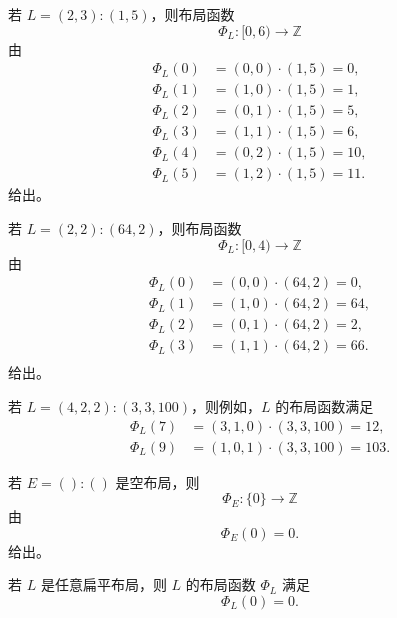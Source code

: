 \begin{example}\label{layoutfunctionexample1layout1}
    若 $L = (2,3):(1,5)$，则布局函数
    \[
    \Phi_L:[0,6) \to \mathbb{Z}
    \]
    由
    \begin{align*}
    \Phi_L(0) & = (0,0) \cdot (1,5) = 0,\\
    \Phi_L(1) & = (1,0) \cdot (1,5) = 1,\\
    \Phi_L(2) & = (0,1) \cdot (1,5) = 5,\\
    \Phi_L(3) & = (1,1) \cdot (1,5) = 6,\\
    \Phi_L(4) & = (0,2) \cdot (1,5) = 10,\\
    \Phi_L(5) & = (1,2) \cdot (1,5) = 11.
    \end{align*}
    给出。
\end{example}

\begin{example}\label{layoutfunctionexample1layout2}
    若 $L = (2,2):(64,2)$，则布局函数
    \[
    \Phi_L:[0,4) \to \mathbb{Z}
    \]
    由
    \begin{align*}
    \Phi_L(0) & = (0,0) \cdot (64,2) = 0,\\
    \Phi_L(1) & = (1,0) \cdot (64,2) = 64,\\
    \Phi_L(2) & = (0,1) \cdot (64,2) = 2,\\
    \Phi_L(3) & = (1,1) \cdot (64,2) = 66.\\
    \end{align*}
    给出。
\end{example}

\begin{example}\label{layoutfunctionexample2}
    若 $L = (4,2,2):(3,3,100)$，则例如，$L$ 的布局函数满足
    \begin{align*}
    \Phi_L(7) & = (3,1,0) \cdot (3,3,100) = 12\text{,}\\
    \Phi_L(9) & = (1,0,1) \cdot (3,3,100) = 103.
    \end{align*}
\end{example}
\begin{example}
    若 $E = ():()$ 是空布局，则
    \[
    \Phi_E:\{0\} \to \mathbb{Z}
    \]
    由
    \[
    \Phi_E(0) = 0.
    \]
    给出。
\end{example}

\begin{example}
    若 $L$ 是任意扁平布局，则 $L$ 的布局函数 $\Phi_L$ 满足
    \[
    \Phi_L(0) = 0.
    \]
\end{example}

